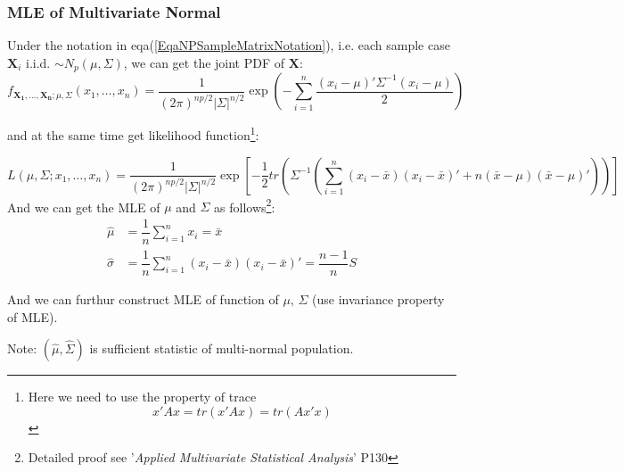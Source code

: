     
    
\subsubsection{MLE of Multivariate Normal}
    Under the notation in eqa(\ref{EqaNPSampleMatrixNotation}), i.e. each sample case $ \mathbf{X}_i$ i.i.d. $\sim N_p(\mu,\Sigma ) $, we can get the joint PDF of $ \mathbf{X} $:
    \[
        f_{\mathbf{X_1},\ldots,\mathbf{X_n};\mu,\Sigma }(x_1,\ldots,x_n)=\dfrac{1}{(2\pi)^{np/2}|\Sigma |^{n/2}}\exp\left( -\sum_{i=1}^n\dfrac{(x_i-\mu)'\Sigma ^{-1}(x_i-\mu)}{2} \right) 
    \]
  
    and at the same time get likelihood function\footnote{Here we need to use the property of trace
    \[
        x'Ax=tr(x'Ax)=tr(Ax'x)
    \]    }:
    
    \[
        L(\mu ,\Sigma;x_1,\ldots,x_n)=\dfrac{1}{(2\pi)^{np/2}|\Sigma |^{n/2}}\exp\left[ -\dfrac{1}{2}tr\left( \Sigma ^{-1} \left(\sum_{i=1}^n(x_i-\bar{x})(x_i-\bar{x})'+n(\bar{x}-\mu)(\bar{x}-\mu)' \right) \right) \right]
    \]
        And we can get the MLE of $ \mu $ and $ \Sigma  $ as follows\footnote{Detailed proof see '\textit{Applied Multivariate Statistical Analysis}' P130}:
        \begin{align*}
            \hat{\mu}&= \dfrac{1}{n}\sum_{i=1}^n x_i=\bar{x} \\
            \hat{\sigma }&= \dfrac{1}{n}\sum_{i=1}^n(x_i-\bar{x})(x_i-\bar{x})'=\dfrac{n-1}{n}S
        \end{align*}

    
    And we can furthur construct MLE of function of $ \mu,\,\Sigma  $ (use invariance property of MLE).
    
        Note: $ (\hat{\mu} , \hat{\Sigma} ) $ is sufficient statistic of multi-normal population.







    
